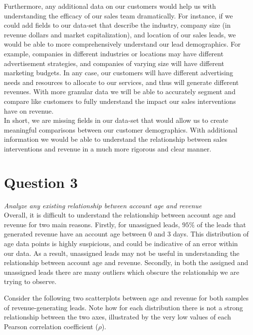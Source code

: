 \documentclass[11pt]{article}
\begin{document}
Furthermore, any additional data on our customers would help us with understanding the efficacy of our sales team dramatically. For instance, if we could add fields to our data-set that describe the industry, company size (in revenue dollars and market capitalization), and location of our sales leads, we would be able to more comprehensively understand our lead demographics. For example, companies in different industries or locations may have different advertisement strategies, and companies of varying size will have different marketing budgets. In any case, our customers will have different advertising needs and resources to allocate to our services, and thus will generate different revenues. With more granular data we will be able to accurately segment and compare like customers to fully understand the impact our sales interventions have on revenue. \\

In short, we are missing fields in our data-set that would allow us to create meaningful comparisons between our customer demographics. With additional information we would be able to understand the relationship between sales interventions and revenue in a much more rigorous and clear manner.

\newpage

\section{Question 3}
\textit{Analyze any existing relationship between account age and revenue} \\

Overall, it is difficult to understand the relationship between account age and revenue for two main reasons. Firstly, for unassigned leads, $95\%$ of the leads that generated revenue have an account age between 0 and 3 days. This distribution of age data points is highly suspicious, and could be indicative of an error within our data. As a result, unassigned leads may not be useful in understanding the relationship between account age and revenue. Secondly, in both the assigned and unassigned leads there are many outliers which obscure the relationship we are trying to observe. 

Consider the following two scatterplots between age and revenue for both samples of revenue-generating leads. Note how for each distribution there is not a strong relationship between the two axes, illustrated by the very low values of each Pearson correlation coefficient ($\rho$). \\
\end{document}
